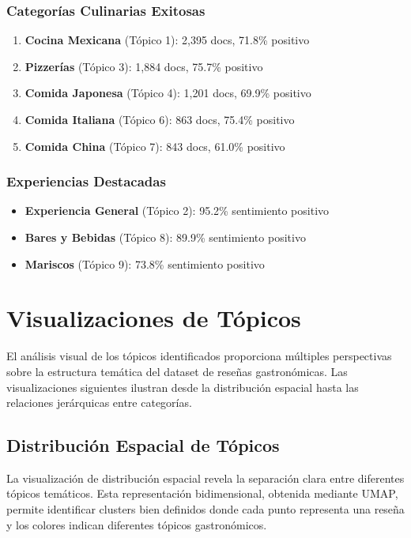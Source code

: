 \documentclass[12pt,a4paper,twoside,openany]{book}
\begin{document}
\subsubsection{Categorías Culinarias Exitosas}
\begin{enumerate}
    \item \textbf{Cocina Mexicana} (Tópico 1): 2,395 docs, 71.8\% positivo
    \item \textbf{Pizzerías} (Tópico 3): 1,884 docs, 75.7\% positivo
    \item \textbf{Comida Japonesa} (Tópico 4): 1,201 docs, 69.9\% positivo
    \item \textbf{Comida Italiana} (Tópico 6): 863 docs, 75.4\% positivo
    \item \textbf{Comida China} (Tópico 7): 843 docs, 61.0\% positivo
\end{enumerate}

\subsubsection{Experiencias Destacadas}
\begin{itemize}
    \item \textbf{Experiencia General} (Tópico 2): 95.2\% sentimiento positivo
    \item \textbf{Bares y Bebidas} (Tópico 8): 89.9\% sentimiento positivo
    \item \textbf{Mariscos} (Tópico 9): 73.8\% sentimiento positivo
\end{itemize}

\section{Visualizaciones de Tópicos}

El análisis visual de los tópicos identificados proporciona múltiples perspectivas sobre la estructura temática del dataset de reseñas gastronómicas. Las visualizaciones siguientes ilustran desde la distribución espacial hasta las relaciones jerárquicas entre categorías.

\subsection{Distribución Espacial de Tópicos}

La visualización de distribución espacial revela la separación clara entre diferentes tópicos temáticos. Esta representación bidimensional, obtenida mediante UMAP, permite identificar clusters bien definidos donde cada punto representa una reseña y los colores indican diferentes tópicos gastronómicos.
\end{document}
